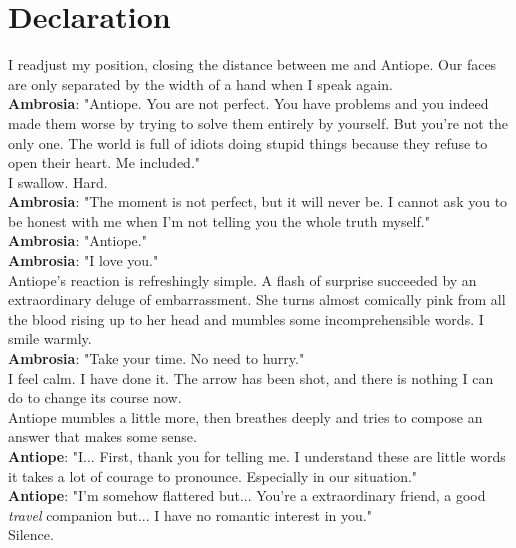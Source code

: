 \documentclass{report}
\newcommand{\speaker}[1]{
	\textbf{#1}: 
}
\newcommand{\gsection}[1]{
	\section*{#1}
	\label{#1}
}
\begin{document}
\gsection{Declaration}

I readjust my position, closing the distance between me and Antiope. Our faces are only separated by the width of a hand when I speak again.\\

\speaker{Ambrosia} "Antiope. You are not perfect. You have problems and you indeed made them worse by trying to solve them entirely by yourself. But you're not the only one. The world is full of idiots doing stupid things because they refuse to open their heart. Me included."\\

I swallow. Hard.\\

\speaker{Ambrosia} "The moment is not perfect, but it will never be. I cannot ask you to be honest with me when I'm not telling you the whole truth myself."\\

\speaker{Ambrosia} "Antiope."\\

\speaker{Ambrosia} "I love you."\\

Antiope's reaction is refreshingly simple. A flash of surprise succeeded by an extraordinary deluge of embarrassment. She turns almost comically pink from all the blood rising up to her head and mumbles some incomprehensible words. I smile warmly.\\

\speaker{Ambrosia} "Take your time. No need to hurry."\\

I feel calm. I have done it. The arrow has been shot, and there is nothing I can do to change its course now.\\

Antiope mumbles a little more, then breathes deeply and tries to compose an answer that makes some sense.\\

\speaker{Antiope} "I... First, thank you for telling me. I understand these are little words it takes a lot of courage to pronounce. Especially in our situation."\\

\speaker{Antiope} "I'm somehow flattered but... You're a extraordinary friend, a good \emph{travel} companion but... I have no romantic interest in you."\\

Silence.\\
\end{document}
